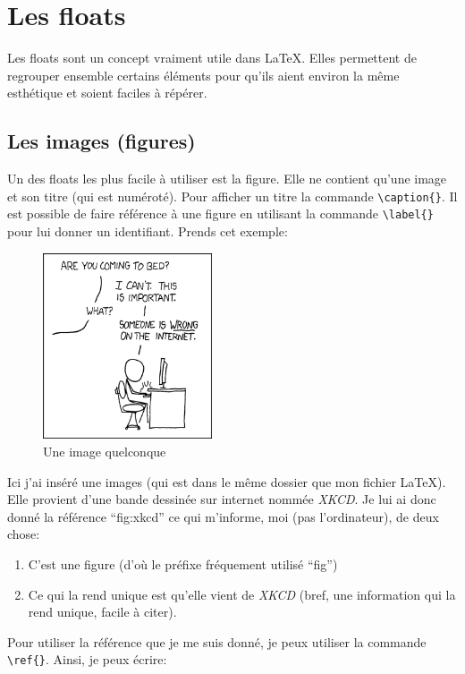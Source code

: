 \documentclass[a4paper, 10pt]{article}
\begin{document}
\section{Les floats}

Les floats sont un concept vraiment utile dans \LaTeX. Elles permettent de
regrouper ensemble certains éléments pour qu'ils aient environ la même
esthétique et soient faciles à répérer.

\subsection{Les images (figures)}

Un des floats les plus facile à utiliser est la figure. Elle ne contient
qu'une image et son titre (qui est numéroté). Pour afficher un titre la
commande \verb+\caption{}+. Il est possible de faire référence à une
figure en utilisant la commande \verb+\label{}+ pour lui donner un
identifiant. Prends cet exemple:

\begin{figure}[H]
  \begin{center}
    \caption{Une image quelconque}
    \label{fig:xkcd}
    \includegraphics[width=5cm]{image.png}
  \end{center}
\end{figure}

Ici j'ai inséré une images (qui est dans le même dossier que mon fichier
\LaTeX). Elle provient d'une bande dessinée sur internet nommée \textit{XKCD}.
Je lui ai donc donné la référence ``fig:xkcd'' ce qui m'informe, moi (pas
l'ordinateur), de deux chose:

\begin{enumerate}
\item
  C'est une figure (d'où le préfixe fréquement utilisé ``fig'')
\item
  Ce qui la rend unique est qu'elle vient de \textit{XKCD}
  (bref, une information qui la rend unique, facile à citer).
\end{enumerate}
Pour utiliser la référence que je me suis donné, je peux utiliser la commande
\verb+\ref{}+. Ainsi, je peux écrire:
\end{document}
